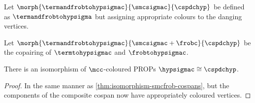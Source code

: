 \begin{definition}
    Let \(\morph{\termandfrobtohypsigmac}{\smcsigmac}{\cspdchyp}\) be defined
    as \(\termandfrobtohypsigma\) but assigning appropriate colours to the
    danging vertices.
\end{definition}

\begin{definition}
    Let \(
    \morph{\termandfrobtohypsigmac}{\smcsigmac + \frobc}{\cspdchyp}
    \) be the copairing of \(\termtohypsigmac\) and
    \(\frobtohypsigmac\).
\end{definition}

\begin{theorem}
    There is an isomorphism of \(\mcc\)-coloured PROPs
    \(\hypsigmac \cong \cspdchyp\).
\end{theorem}
\begin{proof}
    In the same manner as \cref{thm:isomorphism-smcfrob-cospans}, but the
    components of the composite cospan now have appropriately coloured vertices.
\end{proof}
